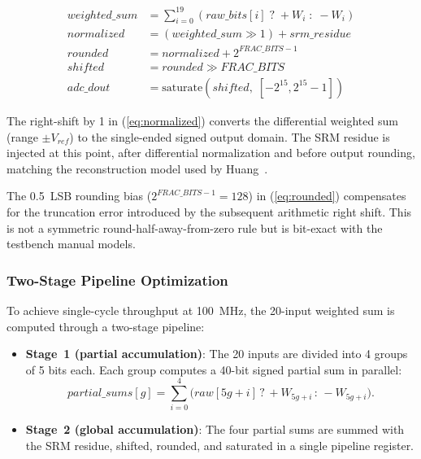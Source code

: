 \documentclass[journal]{IEEEtran}
\begin{document}
\begin{align}
weighted\_sum &= \sum_{i=0}^{19} (raw\_bits[i] \;?\; +W_i \;:\; -W_i)
\label{eq:weighted_sum} \\
normalized &= (weighted\_sum \gg 1) + srm\_residue
\label{eq:normalized} \\
rounded &= normalized + 2^{FRAC\_BITS - 1}
\label{eq:rounded} \\
shifted &= rounded \gg FRAC\_BITS
\label{eq:shifted} \\
adc\_dout &= \mathrm{saturate}(shifted,\; [-2^{15}, 2^{15}-1])
\label{eq:saturate}
\end{align}

The right-shift by 1 in (\ref{eq:normalized}) converts the differential
weighted sum (range $\pm V_{ref}$) to the single-ended signed output domain.
The SRM residue is injected at this point, after differential normalization
and before output rounding, matching the reconstruction model used by
Huang~\cite{huang_jssc_2025}.

The 0.5~LSB rounding bias ($2^{FRAC\_BITS-1} = 128$) in (\ref{eq:rounded})
compensates for the truncation error introduced by the subsequent arithmetic
right shift. This is not a symmetric round-half-away-from-zero rule but is
bit-exact with the testbench manual models.

\subsubsection{Two-Stage Pipeline Optimization}

To achieve single-cycle throughput at 100~MHz, the 20-input weighted sum is
computed through a two-stage pipeline:

\begin{itemize}
    \item \textbf{Stage~1 (partial accumulation)}: The 20 inputs are divided
          into 4 groups of 5 bits each. Each group computes a 40-bit signed
          partial sum in parallel:
          \begin{equation}
          partial\_sums[g] = \sum_{i=0}^{4} \bigl(raw[5g+i]\,?\,+W_{5g+i}\,{:}\,-W_{5g+i}\bigr).
          \label{eq:partial_sum}
          \end{equation}
    \item \textbf{Stage~2 (global accumulation)}: The four partial sums are
          summed with the SRM residue, shifted, rounded, and saturated in a
          single pipeline register.
\end{itemize}
\end{document}
